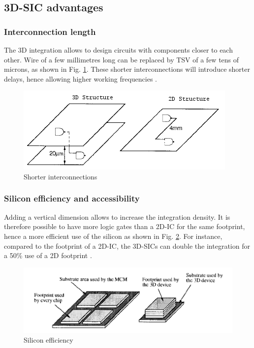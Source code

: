 \subsection{3D-SIC advantages}

\subsubsection{Interconnection length}

The 3D integration allows to design circuits with components closer to each other. Wire of a few millimetres long can be replaced by TSV of a few tens of microns, as shown in Fig. \ref{fig:wire}. These shorter interconnections will introduce shorter delays, hence allowing higher working frequencies \cite{659500,981091}.

\begin{figure}[h!]
\begin{center}
\includegraphics[width=0.75\linewidth]{wire.png}
\end{center}
\vspace{-0.5cm}
\caption{Shorter interconnections \cite{659500}}
\label{fig:wire}
\end{figure}

\subsubsection{Silicon efficiency and accessibility}

Adding a vertical dimension allows to increase the integration density. It is therefore possible to have more logic gates than a 2D-IC for the same footprint, hence a more efficient use of the silicon as shown in Fig. \ref{fig:footprint}. For instance, compared to the footprint of a 2D-IC, the 3D-SICs can double the integration for a 50\% use of a 2D footprint \cite{659500}.

\begin{figure}[h!]
\begin{center}
\includegraphics[width=0.75\linewidth]{footprint.png}
\end{center}
\vspace{-0.5cm}
\caption{Silicon efficiency \cite{659500}}
\label{fig:footprint}
\end{figure}

